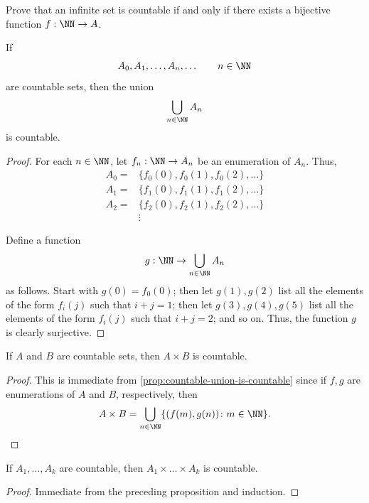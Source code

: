 \begin{exercise}
  Prove that an infinite set is countable if and only if there exists a bijective function $f:\NN \to A$.
\end{exercise}

\begin{proposition}
  \label{prop:countable-union-is-countable}
  If
  \[
    A_0, A_1, \dots, A_n,\dots  \qquad n\in\NN
  \]
  are countable sets, then the union
  \[
    \bigcup_{n\in\NN} A_n
  \]
  is countable.
\end{proposition}

\begin{proof}
  For each $n\in \NN$, let $f_n:\NN \to A_n$  be an enumeration of  $A_n$.
  Thus,
  \begin{align*}
  A_0= & \{f_0(0), f_0(1), f_0(2), \dots\} \\
  A_1= & \{f_1(0), f_1(1), f_1(2), \dots\} \\
  A_2= & \{f_2(0), f_2(1), f_2(2), \dots\} \\
       & \vdots
  \end{align*}

  Define a function
  \[
    g:\NN \to \bigcup_{n\in \NN}A_n
  \]
  as follows.
  Start with $g(0)=f_0(0)$;
  then let $g(1),g(2)$ list all the elements of the form $f_i(j)$ such that $i+j=1$;
  then  let $g(3),g(4),g(5)$ list all the elements of the form $f_i(j)$ such that $i+j=2$;
  and so on.
  Thus, the function $g$ is clearly surjective.
\end{proof}

\begin{proposition}
  If $A$ and $B$ are countable sets, then $A\times B$ is countable.
\end{proposition}

\begin{proof}
  This is immediate from \cref{prop:countable-union-is-countable} since if $f,g$ are enumerations of $A$ and $B$, respectively, then
  \[
    A\times B=\bigcup_{n\in\NN} \{(f(m),g(n))\colon m\in \NN\}.
  \]
\end{proof}

\begin{corollary}
  \label{cor:words-of-fixed-length}
  If $A_1,\dots, A_k$ are countable, then $A_1\times\dots\times A_k$ is countable.
\end{corollary}

\begin{proof}
  Immediate from the preceding proposition and induction.
\end{proof}

